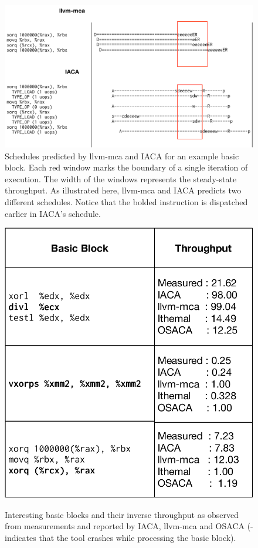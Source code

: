 \begin{figure}[htbp!]
    \includegraphics[width=0.95\columnwidth]{figures/scheduling.pdf}
    \caption{Schedules predicted by llvm-mca and IACA for an example basic block.
    Each red window marks the boundary of a single iteration of execution.
    The width of the windows represents the steady-state throughput.
    As illustrated here, llvm-mca and IACA predicts two different schedules.
    Notice that the bolded instruction is dispatched earlier in IACA's schedule.
    }
    \label{tab:case-study}
\end{figure}

\begin{figure}[htbp!]
    \begin{center}
    \includegraphics[width=0.7\columnwidth]{figures/interesting-examples.pdf}
    \caption{Interesting basic blocks and their inverse throughput as observed from measurements and reported by IACA, llvm-mca and OSACA (- indicates that the tool crashes while processing the basic block).}
    \label{tab:case-study}
    \label{fig:schedule}
    \end{center}
\end{figure}